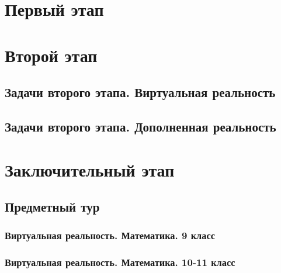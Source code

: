 \documentclass[a4paper,12pt,oneside]{book}
\begin{document}

\setcounter{tocdepth}{1}

\tableofcontents

\part{Первый этап}




\part{Второй этап}

\chapter{Задачи второго этапа. Виртуальная реальность}


\chapter{Задачи второго этапа. Дополненная реальность}




\part{Заключительный этап}

\clearpage
\chapter{Предметный тур}

\section{Виртуальная реальность. Математика. 9 класс}


\section{Виртуальная реальность. Математика. 10-11 класс}

\end{document}
